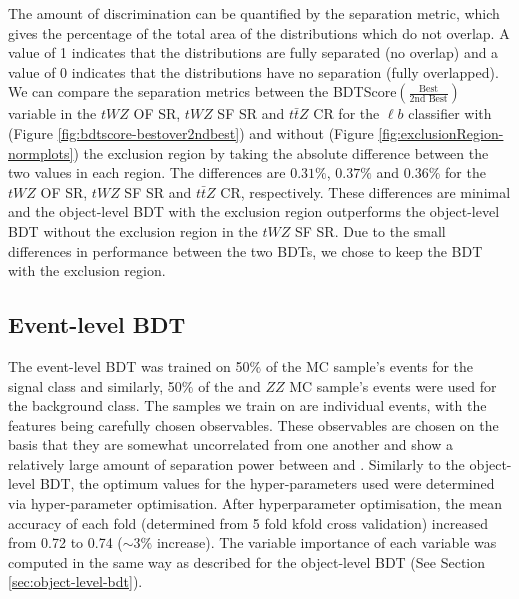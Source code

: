 The amount of discrimination can be quantified by the separation metric, which gives the percentage of the total area of the distributions which do not overlap. A value of 1 indicates that the distributions are fully separated (no overlap) and a value of 0 indicates that the distributions have no separation (fully overlapped). We can compare the separation metrics between the BDTScore$(\frac{\text{Best}}{\text{2nd Best}})$ variable in the $tWZ$ OF SR, $tWZ$ SF SR and $t\bar{t}Z$ CR for the $\ell b$ classifier with (Figure \ref{fig:bdtscore-bestover2ndbest}) and without (Figure \ref{fig:exclusionRegion-normplots}) the exclusion region by taking the absolute difference between the two values in each region. The differences are $0.31\%$, $0.37\%$ and $0.36\%$ for the $tWZ$ OF SR, $tWZ$ SF SR and $t\bar{t}Z$ CR, respectively. These differences are minimal and the object-level BDT with the exclusion region outperforms the object-level BDT without the exclusion region in the $tWZ$ SF SR. Due to the small differences in performance between the two BDTs, we chose to keep the BDT with the exclusion region.



\subsection{Event-level BDT}
\label{sec:event-level-bdt}
The event-level BDT was trained on 50$\%$ of the \tWZ MC sample's events for the signal class and similarly, 50$\%$ of the \ttZ and $ZZ$ MC sample's events were used for the background class. The samples we train on are individual events, with the features being carefully chosen observables. These observables are chosen on the basis that they are somewhat uncorrelated from one another and show a relatively large amount of separation power between \tWZ and \ttZ. Similarly to the object-level BDT, the optimum values for the hyper-parameters used were determined via hyper-parameter optimisation.  After hyperparameter optimisation, the mean accuracy of each fold (determined from 5 fold kfold cross validation) increased from 0.72 to 0.74 ($\sim 3\%$ increase). The variable importance of each variable was computed in the same way as described for the object-level BDT (See Section \ref{sec:object-level-bdt}).\\

